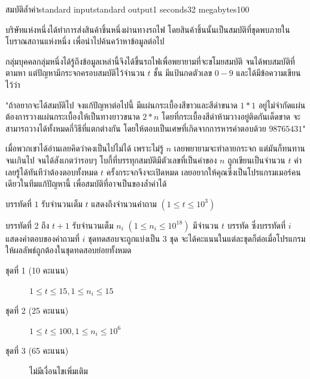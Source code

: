 \documentclass[11pt,a4paper]{article}
\begin{document}
\begin{problem}{สมบัติล้ำค่า}{standard input}{standard output}{1 seconds}{32 megabytes}{100}

บริษัทแห่งหนึ่งได้ทำการส่งสินค้าชิ้นหนึ่งผ่านทางรถไฟ โดยสินค้าชิ้นนั้นเป็นสมบัติที่ขุดพบภายในโบราณสถานแห่งหนึ่ง เพื่อนำไปค้นคว้าหาข้อมูลต่อไป

กลุ่มบุคคลกลุ่มหนึ่งได้รู้ถึงข้อมูลเหล่านี้จึงได้ขึ้นรถไฟเพื่อพยายามที่จะขโมยสมบัติ จนได้พบสมบัติที่ตามหา แต่ปัญหามีกระจกครอบสมบัติไว้จำนวน $t$ ชั้น มีแป้นกดตัวเลข $0-9$ และได้มีข้อความเขียนไว้ว่า 

"ถ้าอยากจะได้สมบัติไป จงแก้ปัญหาต่อไปนี้ มีแผ่นกระเบื้องสีขาวและสีดำขนาด $1*1$ อยู่ไม่จำกัดแผ่น ต้องการวางแผ่นกระเบื้องให้เป็นทางยาวขนาด $2*n$ โดยที่กระเบื้องสีดำห้ามวางอยู่ติดกันเด็ดขาด จะสามารถวางได้ทั้งหมดกี่วิธีที่แตกต่างกัน โดยให้ตอบเป็นเศษที่เกิดจากการหารคำตอบด้วย $98765431$"

เมื่อพวกเขาได้อ่านเลยคิดว่าคงเป็นไปไม่ได้ เพราะไม่รู้ $n$ เลยพยายามจะทำลายกระจก แต่มันก็ทนทานจนเกินไป จนได้สังเกตว่ารอบๆ โบกี้ที่บรรทุกสมบัติมีตัวเลขที่เป็นค่าของ $n$ ถูกเขียนเป็นจำนวน $t$ ค่า เลยรู้ได้ทันทีว่าต้องตอบทั้งหมด $t$ ครั้งกระจกจึงจะเปิดหมด เลยอยากให้คุณซึ่งเป็นโปรแกรมเมอร์คนเดียวในทีมแก้ปัญหานี้ เพื่อสมบัติที่อาจเป็นของล้ำค่าได้

\InputFile
บรรทัดที่ $1$ รับจำนวนเต็ม $t$ แสดงถึงจำนวนคำถาม $(1 \leq t \leq 10^3)$

บรรทัดที่ $2$ ถึง $t + 1$ รับจำนวนเต็ม $n_i$ $(1 \leq n_i \leq10^{18})$
\OutputFile
มีจำนวน $t$ บรรทัด ซึ่งบรรทัดที่ $i$ แสดงคำตอบของคำถามที่ $i$ 
\Scoring
ชุดทดสอบจะถูกแบ่งเป็น $3$ ชุด จะได้คะแนนในแต่ละชุดก็ต่อเมื่อโปรแกรมให้ผลลัพธ์ถูกต้องในชุดทดสอบย่อยทั้งหมด

\begin{description}

\item[ชุดที่ 1 (10 คะแนน)]  $1 \leq t \leq 15 , 1 \leq n_i \leq 15$ 

\item[ชุดที่ 2 (25 คะแนน)] $1 \leq t \leq 100 , 1 \leq n_i \leq 10^{6}$

\item[ชุดที่ 3 (65 คะแนน)] ไม่มีเงื่อนไขเพิ่มเติม

\end{description}

\Examples

\begin{example}
%
%
\end{example}


\end{problem}
\end{document}
